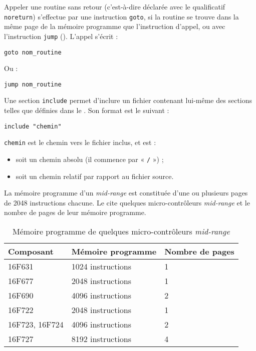 
Appeler une routine sans retour (c'est-à-dire déclarée avec le qualificatif \texttt{noreturn}) s'effectue par une instruction \texttt{goto}, si la routine se trouve dans la même page de la mémoire programme que l'instruction d'appel, ou avec l'instruction \texttt{jump} (). L'appel s'écrit :
\begin{lstlisting}[language=piccolo]
goto nom_routine
\end{lstlisting}

Ou :

\begin{lstlisting}[language=piccolo]
jump nom_routine
\end{lstlisting}





Une section \texttt{include} permet d'inclure un fichier contenant lui-même des sections telles que définies dans le .  Son format est le suivant :

\begin{lstlisting}[language=piccolo]
  include "chemin"
\end{lstlisting}

\texttt{chemin} est le chemin vers le fichier inclus, et est :
\begin{itemize}
  \item soit un chemin absolu (il commence par « \texttt{/} ») ;
  \item soit un chemin relatif par rapport au fichier source.
\end{itemize}


La mémoire programme d'un \emph{mid-range} est constituée d'une ou plusieurs pages de 2048 instructions chacune. Le  cite quelques micro-contrôleurs \emph{mid-range} et le nombre de pages de leur mémoire programme.

\begin{table}[!ht]
  \centering
  \small
  \begin{tabular}{lll}
    \textbf{Composant} & \textbf{Mémoire programme} & \textbf{Nombre de pages}\\
    \hline
    16F631  & 1024 instructions & 1\\
    16F677  & 2048 instructions & 1\\
    16F690  & 4096 instructions & 2\\
    16F722  & 2048 instructions & 1\\
    16F723, 16F724  & 4096 instructions & 2\\
    16F727  & 8192 instructions & 4\\
    \hline
  \end{tabular}
  \caption{Mémoire programme de quelques micro-contrôleurs \emph{mid-range}}
\end{table}

